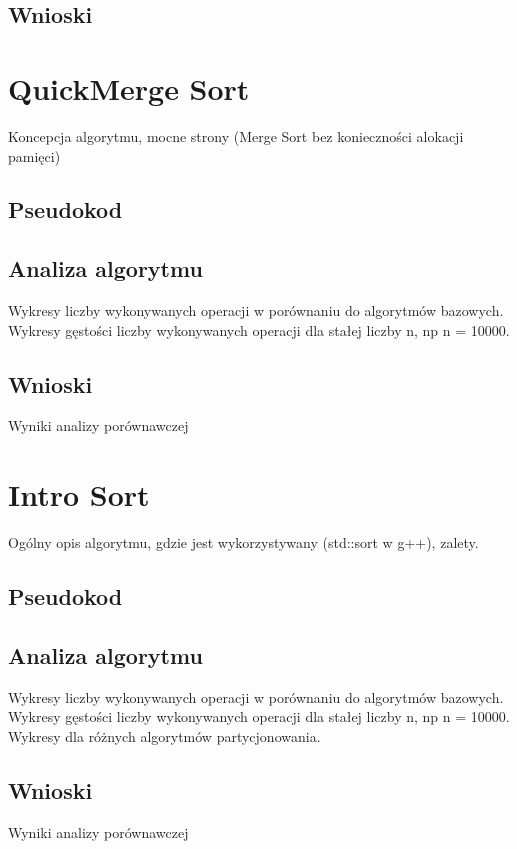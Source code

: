 \begin{figure}[]
	\centering
	
	\caption[]{}
	\label{fig:quick-sort-nondeterministic-pivot-density}
\end{figure}

\subsection{Wnioski}

\section{QuickMerge Sort}
Koncepcja algorytmu, mocne strony (Merge Sort bez konieczności alokacji pamięci)

\subsection{Pseudokod}

\subsection{Analiza algorytmu}
Wykresy liczby wykonywanych operacji w porównaniu do algorytmów bazowych.
Wykresy gęstości liczby wykonywanych operacji dla stałej liczby n, np n = 10000.

\subsection{Wnioski}
Wyniki analizy porównawczej


\section{Intro Sort}
Ogólny opis algorytmu, gdzie jest wykorzystywany (std::sort w g++), zalety.
\subsection{Pseudokod}

\subsection{Analiza algorytmu}
Wykresy liczby wykonywanych operacji w porównaniu do algorytmów bazowych.
Wykresy gęstości liczby wykonywanych operacji dla stałej liczby n, np n = 10000.
Wykresy dla różnych algorytmów partycjonowania.

\subsection{Wnioski}
Wyniki analizy porównawczej



